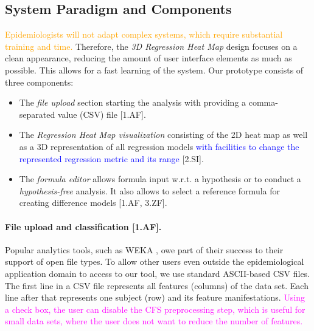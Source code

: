 \documentclass[journal]{style/vgtc} 			          %
\newcommand{\add}[1]{\textcolor{blue}{#1}}
\newcommand{\design}[1]{\textcolor{orange}{#1}}
\newcommand{\magenta}[1]{\textcolor{magenta}{#1}}
\begin{document}
\subsection{System Paradigm and Components}
\design{
Epidemiologists will not adapt complex systems, which require substantial training and time. %
}
Therefore, the \emph{3D Regression Heat Map} design focuses on a clean appearance, reducing the amount of user interface elements as much as possible.
This allows for a fast learning of the system.
Our prototype consists of three components:
\begin{itemize}
	\item The \emph{file upload} section starting the analysis with providing a comma-separated value (CSV) file [1.AF].
	\item The \emph{Regression Heat Map visualization} consisting of the 2D heat map as well as a 3D representation of all regression models \add{with facilities to change the represented regression metric and its range} [2.SI].
	\item The \emph{formula editor} allows formula input w.r.t. a hypothesis or to conduct a \emph{hypothesis-free} analysis.
	It also allows to select a reference formula for creating difference models [1.AF, 3.ZF].
\end{itemize}
\paragraph{File upload and classification [\textbf{1.AF}].}
Popular analytics tools, such as WEKA \cite{WEKA}, owe part of their success to their support of open file types.
To allow other users even outside the epidemiological application domain to access to our tool, we use standard ASCII-based CSV files.
The first line in a CSV file represents all features (columns) of the data set.
Each line after that represents one subject (row) and its feature manifestations.
\magenta{Using a check box, the user can disable the CFS preprocessing step, which is useful for small data sets, where the user does not want to reduce the number of features.}
\end{document}
